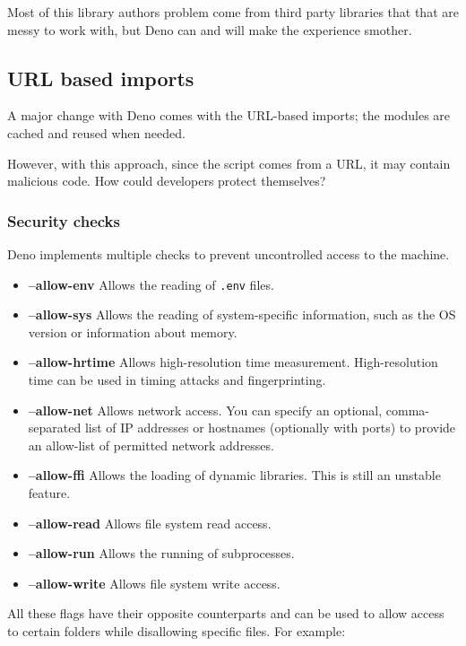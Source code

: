 \documentclass[10pt,journal,compsoc]{IEEEtran}
\begin{document}
Most of this library authors problem come from third party libraries that that are messy to work with, but Deno can and will make the experience smother.

\subsection{URL based imports}

A major change with Deno comes with the URL-based imports; the modules are cached and reused when needed.

However, with this approach, since the script comes from a URL, it may contain malicious code. How could developers protect themselves?

\subsubsection{Security checks}

Deno implements multiple checks to prevent uncontrolled access to the machine. \cite{DenoSec}

\begin{itemize}
    \item \textbf{--allow-env} Allows the reading of \verb|.env| files.
    \item \textbf{--allow-sys} Allows the reading of system-specific information, such as the OS version or information about memory.
    \item \textbf{--allow-hrtime} Allows high-resolution time measurement. High-resolution time can be used in timing attacks and fingerprinting.
    \item \textbf{--allow-net} Allows network access. You can specify an optional, comma-separated list of IP addresses or hostnames (optionally with ports) to provide an allow-list of permitted network addresses.
    \item \textbf{--allow-ffi} Allows the loading of dynamic libraries. This is still an unstable feature.
    \item \textbf{--allow-read} Allows file system read access.
    \item \textbf{--allow-run} Allows the running of subprocesses.
    \item \textbf{--allow-write} Allows file system write access.
\end{itemize}

All these flags have their opposite counterparts and can be used to allow access to certain folders while disallowing specific files. For example:
\end{document}
